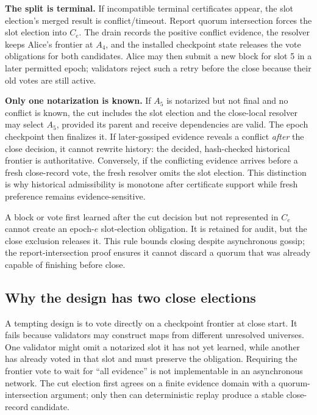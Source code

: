 \documentclass[sigplan,review,anonymous]{acmart}
\newcommand{\paragraphhead}[1]{\smallskip\noindent\textbf{#1}}
\begin{document}
\paragraphhead{The split is terminal.}
If incompatible terminal certificates appear, the slot election's merged result is conflict/timeout.  Report quorum intersection forces the slot election into $C_e$.  The drain records the positive conflict evidence, the resolver keeps Alice's frontier at $A_4$, and the installed checkpoint state releases the vote obligations for both candidates.  Alice may then submit a new block for slot 5 in a later permitted epoch; validators reject such a retry before the close because their old votes are still active.

\paragraphhead{Only one notarization is known.}
If $A_5$ is notarized but not final and no conflict is known, the cut includes the slot election and the close-local resolver may select $A_5$, provided its parent and receive dependencies are valid.  The epoch checkpoint then finalizes it.  If later-gossiped evidence reveals a conflict \emph{after} the close decision, it cannot rewrite history: the decided, hash-checked historical frontier is authoritative.  Conversely, if the conflicting evidence arrives before a fresh close-record vote, the fresh resolver omits the slot election.  This distinction is why historical admissibility is monotone after certificate support while fresh preference remains evidence-sensitive.

A block or vote first learned after the cut decision but not represented in $C_e$ cannot create an epoch-$e$ slot-election obligation.  It is retained for audit, but the close exclusion releases it.  This rule bounds closing despite asynchronous gossip; the report-intersection proof ensures it cannot discard a quorum that was already capable of finishing before close.

\subsection{Why the design has two close elections}

A tempting design is to vote directly on a checkpoint frontier at close start.  It fails because validators may construct maps from different unresolved universes.  One validator might omit a notarized slot it has not yet learned, while another has already voted in that slot and must preserve the obligation.  Requiring the frontier vote to wait for ``all evidence'' is not implementable in an asynchronous network.  The cut election first agrees on a finite evidence domain with a quorum-intersection argument; only then can deterministic replay produce a stable close-record candidate.
\end{document}
